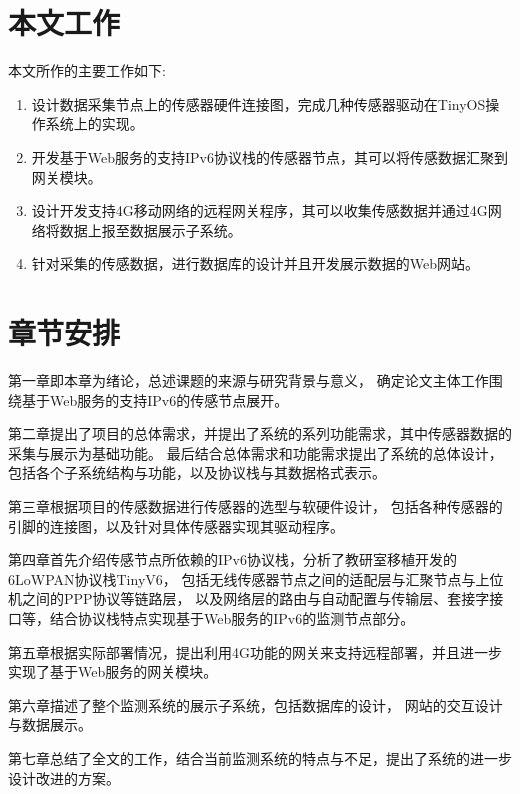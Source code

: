 \section{本文工作}

本文所作的主要工作如下:
\begin{enumerate}
\item 设计数据采集节点上的传感器硬件连接图，完成几种传感器驱动在TinyOS操作系统上的实现。
\item 开发基于Web服务的支持IPv6协议栈的传感器节点，其可以将传感数据汇聚到网关模块。
\item 设计开发支持4G移动网络的远程网关程序，其可以收集传感数据并通过4G网络将数据上报至数据展示子系统。
\item 针对采集的传感数据，进行数据库的设计并且开发展示数据的Web网站。
\end{enumerate}

\section{章节安排}

第一章即本章为绪论，总述课题的来源与研究背景与意义，
确定论文主体工作围绕基于Web服务的支持IPv6的传感节点展开。

第二章提出了项目的总体需求，并提出了系统的系列功能需求，其中传感器数据的采集与展示为基础功能。
最后结合总体需求和功能需求提出了系统的总体设计，包括各个子系统结构与功能，以及协议栈与其数据格式表示。

第三章根据项目的传感数据进行传感器的选型与软硬件设计，
包括各种传感器的引脚的连接图，以及针对具体传感器实现其驱动程序。

第四章首先介绍传感节点所依赖的IPv6协议栈，分析了教研室移植开发的6LoWPAN协议栈TinyV6，
包括无线传感器节点之间的适配层与汇聚节点与上位机之间的PPP协议等链路层，
以及网络层的路由与自动配置与传输层、套接字接口等，结合协议栈特点实现基于Web服务的IPv6的监测节点部分。

第五章根据实际部署情况，提出利用4G功能的网关来支持远程部署，并且进一步实现了基于Web服务的网关模块。

第六章描述了整个监测系统的展示子系统，包括数据库的设计， 网站的交互设计与数据展示。

第七章总结了全文的工作，结合当前监测系统的特点与不足，提出了系统的进一步设计改进的方案。
